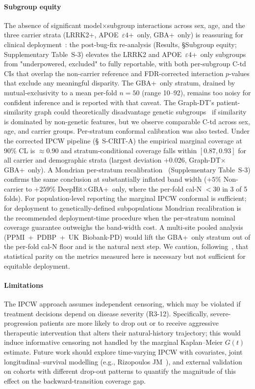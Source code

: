 \documentclass[11pt]{article}
\begin{document}
\paragraph*{Subgroup equity} The absence of significant model$\times$subgroup interactions across sex, age, and the three carrier strata (LRRK2+, APOE~$\varepsilon4$+~only, GBA+~only) is reassuring for clinical deployment~\cite{rajkomar2018ensuring,chen2021ethical}: the post-bug-fix re-analysis (Results, \S Subgroup equity; Supplementary Table~S-3) elevates the LRRK2 and APOE~$\varepsilon4$+~only subgroups from "underpowered, excluded" to fully reportable, with both per-subgroup C-td CIs that overlap the non-carrier reference and FDR-corrected interaction $p$-values that exclude any meaningful disparity. The GBA+~only stratum, drained by mutual-exclusivity to a mean per-fold $n{=}50$ (range 10--92), remains too noisy for confident inference and is reported with that caveat. The Graph-DT's patient-similarity graph could theoretically disadvantage genetic subgroups~\cite{obermeyer2019dissecting} if similarity is dominated by non-genetic features, but we observe comparable C-td across sex, age, and carrier groups. Per-stratum conformal calibration was also tested. Under the corrected IPCW pipeline (\S~S-CRIT-A) the empirical marginal coverage at 90\% CL is $\approx 0.90$ and stratum-conditional coverage falls within $[0.87, 0.93]$ for all carrier and demographic strata (largest deviation $+0.026$, Graph-DT$\times$GBA+~only). A Mondrian per-stratum recalibration~\cite{bostrom2025mondrian,vovk2022conformal} (Supplementary Table~S-3) confirms the same conclusion at substantially inflated band width ($+5\%$ Non-carrier to $+259\%$ DeepHit$\times$GBA+~only, where the per-fold cal-N $<30$ in 3 of 5 folds). For population-level reporting the marginal IPCW conformal is sufficient; for deployment to genetically-defined subpopulations Mondrian recalibration is the recommended deployment-time procedure when the per-stratum nominal coverage guarantee outweighs the band-width cost. A multi-site pooled analysis (PPMI~+~PDBP~+~UK~Biobank-PD) would lift the GBA+~only stratum out of the per-fold cal-N floor and is the natural next step. We caution, following~\cite{mccradden2020ethical}, that statistical parity on the metrics measured here is necessary but not sufficient for equitable deployment.

\paragraph*{Limitations} The IPCW approach assumes independent censoring, which may be violated if treatment decisions depend on disease severity (R3-12). Specifically, severe-progression patients are more likely to drop out or to receive aggressive therapeutic intervention that alters their natural-history trajectory; this would induce informative censoring not handled by the marginal Kaplan--Meier $G(t)$ estimate. Future work should explore time-varying IPCW with covariates, joint longitudinal--survival modelling (e.g., Rizopoulos JM~\cite{shamsutdinova2024survcompare}), and external validation on cohorts with different drop-out patterns to quantify the magnitude of this effect on the backward-transition coverage gap.
\end{document}
